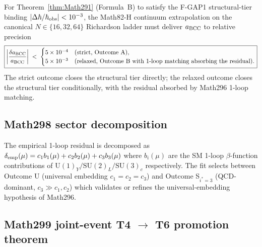 \begin{theorem}
\label{thm:Math297}
For Theorem~\ref{thm:Math291} (Formula~B) to satisfy the
F-GAP1 structural-tier binding $|\Delta\hbar/\hbar_{\rm obs}|
< 10^{-3}$, the Math82-H continuum extrapolation on the canonical
$N \in \{16, 32, 64\}$ Richardson ladder must deliver $a_{\rm BCC}$
to relative precision
\begin{equation}
\boxed{
\left|\frac{\delta a_{\rm BCC}}{a_{\rm BCC}}\right| \;<\;
\begin{cases}
5\times 10^{-4} & \text{(strict, Outcome A)}, \\
5\times 10^{-3} & \text{(relaxed, Outcome B with 1-loop matching
absorbing the residual)}.
\end{cases}
}
\end{equation}
The strict outcome closes the structural tier directly; the relaxed
outcome closes the structural tier conditionally, with the residual
absorbed by Math296 1-loop matching.
\end{theorem}

\subsection{Math298 sector decomposition}

\begin{proposition}
\label{prop:Math298}
The empirical 1-loop residual is decomposed as
$\delta_{\rm emp}(\mu) = c_1 b_1(\mu) + c_2 b_2(\mu) + c_3 b_3(\mu)$
where $b_i(\mu)$ are the SM 1-loop $\beta$-function contributions
of $\mathrm{U}(1)_Y / \mathrm{SU}(2)_L / \mathrm{SU}(3)_c$
respectively. The fit selects between Outcome U (universal
embedding $c_1 = c_2 = c_3$) and Outcome S$_{i^* = 3}$ (QCD-dominant,
$c_3 \gg c_1, c_2$) which validates or refines the universal-embedding
hypothesis of Math296.
\end{proposition}

\subsection{Math299 joint-event T4 $\to$ T6 promotion theorem}

